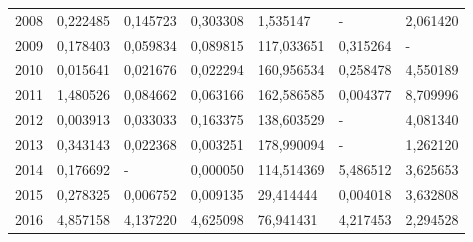 \begin{table}
\begin{tabular}{p{1cm}p{2cm}p{2cm}p{2cm}p{2cm}p{2cm}p{2cm}}
 2008 &                      0,222485 &                                   0,145723 &                        0,303308 &                       1,535147 &                       - &                                  2,061420 \\
 2009 &                      0,178403 &                                   0,059834 &                        0,089815 &                     117,033651 &                0,315264 &                                         - \\
 2010 &                      0,015641 &                                   0,021676 &                        0,022294 &                     160,956534 &                0,258478 &                                  4,550189 \\
 2011 &                      1,480526 &                                   0,084662 &                        0,063166 &                     162,586585 &                0,004377 &                                  8,709996 \\
 2012 &                      0,003913 &                                   0,033033 &                        0,163375 &                     138,603529 &                       - &                                  4,081340 \\
 2013 &                      0,343143 &                                   0,022368 &                        0,003251 &                     178,990094 &                       - &                                  1,262120 \\
 2014 &                      0,176692 &                                          - &                        0,000050 &                     114,514369 &                5,486512 &                                  3,625653 \\
 2015 &                      0,278325 &                                   0,006752 &                        0,009135 &                      29,414444 &                0,004018 &                                  3,632808 \\
 2016 &                      4,857158 &                                   4,137220 &                        4,625098 &                      76,941431 &                4,217453 &                                  2,294528 \\
\bottomrule
\end{tabular}
\end{table}
